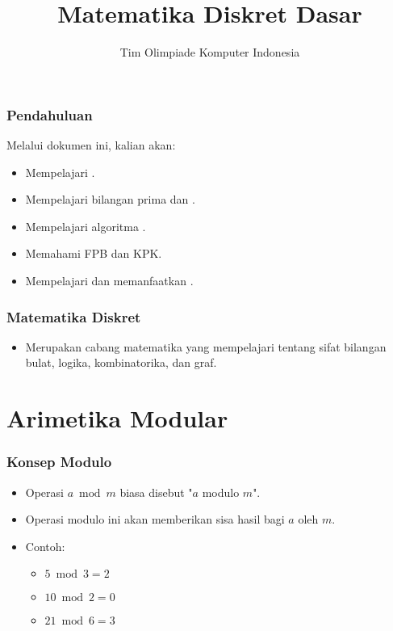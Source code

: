 

\title{Matematika Diskret Dasar}
\author{Tim Olimpiade Komputer Indonesia}
\date{}



\begin{frame}
\titlepage
\end{frame}

\begin{frame}
\frametitle{Pendahuluan}
Melalui dokumen ini, kalian akan:
\begin{itemize}
  \item Mempelajari .
  \item Mempelajari bilangan prima dan .
  \item Mempelajari algoritma .
  \item Memahami FPB dan KPK.
  \item Mempelajari dan memanfaatkan .
\end{itemize}
\end{frame}

\begin{frame}
\frametitle{Matematika Diskret}
\begin{itemize}
  \item Merupakan cabang matematika yang mempelajari tentang sifat bilangan bulat, logika, kombinatorika, dan graf.
\end{itemize}
\end{frame}

\section{Arimetika Modular}
\frame{\sectionpage}

\begin{frame}
\frametitle{Konsep Modulo}
\begin{itemize}
  \item Operasi $a \bmod m$ biasa disebut "$a$ modulo $m$".
  \item Operasi modulo ini akan memberikan sisa hasil bagi $a$ oleh $m$.
  \item Contoh: 
  \begin{itemize}
    \item $5 \bmod 3 = 2$ 
    \item $10 \bmod 2 = 0$
    \item $21 \bmod 6 = 3$
  \end{itemize}  
\end{itemize}
\end{frame}


